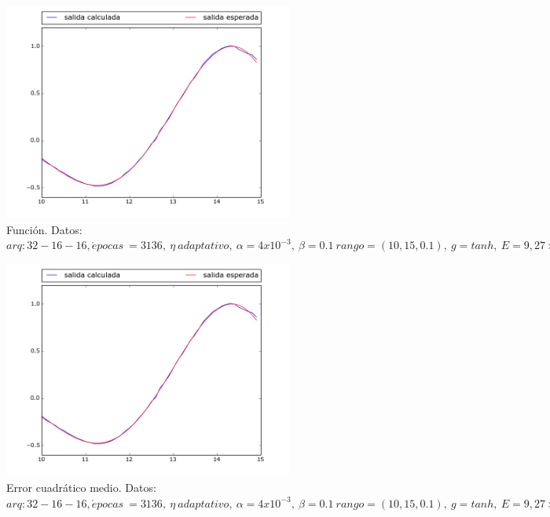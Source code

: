 \documentclass[12pt,a4paper]{article}
\begin{document}
\begin{figure}[H]
\centering
\includegraphics[width=0.85\textwidth]{img/_32__16__16_adaptative-1430833266_2379603-FUNCTION.png}
\caption{\label{fig:test10-15-tanh-fn-32-adaptative} Función. Datos:  $arq: 32-16-16, \acute{e} pocas \ = 3136, \ \eta \ adaptativo, \ \alpha = 4x10^{-3}, \ \beta =0.1  \ rango=(10, 15, 0.1),\ g=tanh, \ E =9,27 \times 10^{-5}$}
\end{figure}

\begin{figure}[H]
\centering
\includegraphics[width=0.85\textwidth]{img/_32__16__16_adaptative-1430833266_2379603-FUNCTION.png}
\caption{\label{fig:test10-15-tanh-error-32-adaptative}  Error cuadrático medio. Datos:  $arq: 32-16-16, \acute{e} pocas \ = 3136, \ \eta \ adaptativo, \ \alpha = 4x10^{-3},\ \beta =0.1  \ rango=(10, 15, 0.1),\ g=tanh, \ E =9,27 \times 10^{-5}$}
\end{figure}
\end{document}
